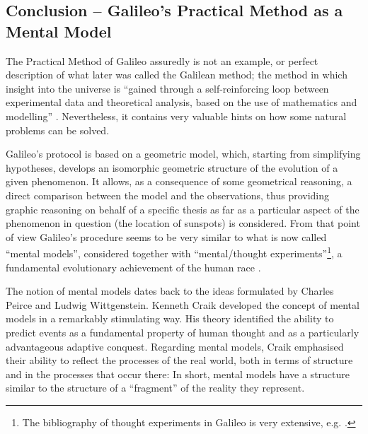 \begin{artengenv}
\section{Conclusion -- Galileo’s Practical Method as a Mental Model}

The Practical Method of Galileo assuredly is not an example, or perfect description of what later was called the
Galilean method; the method in which insight into the universe is ``gained through a self-reinforcing loop between
experimental data and theoretical analysis, based on the use of mathematics and modelling''
\parencite[p.2]{succi_big_2019}.
Nevertheless, it contains very valuable hints on how some
natural problems can be solved.

Galileo’s protocol is based on a geometric model, which, starting from simplifying hypotheses, develops an isomorphic
geometric structure of the evolution of a given phenomenon. It allows, as a consequence of some geometrical reasoning,
a direct comparison between the model and the observations, thus providing graphic reasoning on behalf of a specific
thesis as far as a particular aspect of the phenomenon in question (the location of sunspots) is considered. From that
point of view Galileo’s procedure seems to be very similar to what is now called ``mental models'', considered together
with ``mental/thought experiments''\footnote{The bibliography of thought experiments in Galileo is very extensive, e.g.
\parencite{camilleri_knowing_2015,palmerino_discussing_2018,palmieri_mental_2003}.
}, a fundamental evolutionary achievement
of the human race
\parencite[see][]{nersessian_theoreticians_1992,nersessian_creating_2008,stuart_routledge_2018}.

The notion of mental models dates back to the ideas formulated by Charles Peirce and Ludwig Wittgenstein. Kenneth Craik
developed the concept of mental models in a remarkably stimulating way. His theory identified the ability to predict
events as a fundamental property of human thought and as a particularly advantageous adaptive conquest. Regarding
mental models, Craik emphasised their ability to reflect the processes of the real world, both in terms of structure
and in the processes that occur there:
In short, mental models have a structure similar to the structure of a ``fragment'' of the reality they
represent.


\end{artengenv}
